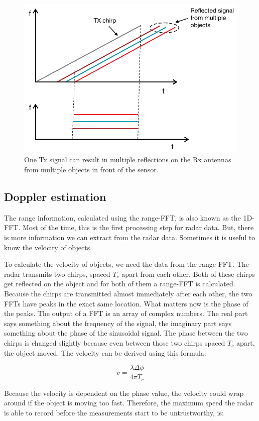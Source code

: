 \begin{figure}[t]
\centering
\includegraphics[width=.5\textwidth]{figures/background/reflected_signals.png}
\caption{One Tx signal can result in multiple reflections on the Rx antennas from multiple objects in front of the sensor.}
\label{fig:if_multiple}
\end{figure}

\subsection{Doppler estimation}
The range information, calculated using the range-FFT, is also known as the 1D-FFT. Most of the time, this is the first processing step for radar data. But, there is more information we can extract from the radar data. Sometimes it is useful to know the velocity of objects. 

To calculate the velocity of objects, we need the data from the range-FFT. The radar transmits two chirps, spaced $T_c$ apart from each other. Both of these chirps get reflected on the object and for both of them a range-FFT is calculated. Because the chirps are transmitted almost immediately after each other, the two FFTs have peaks in the exact same location. What matters now is the phase of the peaks. The output of a FFT is an array of complex numbers. The real part says something about the frequency of the signal, the imaginary part says something about the phase of the sinusoidal signal. The phase between the two chirps is changed slightly because even between those two chirps spaced $T_c$ apart, the object moved. The velocity can be derived using this formula:

\begin{equation}
v = \frac{\lambda \Delta \phi}{4 \pi T_c}
\label{eq:doppler_equation}
\end{equation}

Because the velocity is dependent on the phase value, the velocity could wrap around if the object is moving too fast. Therefore, the maximum speed the radar is able to record before the measurements start to be untrustworthy, is:

